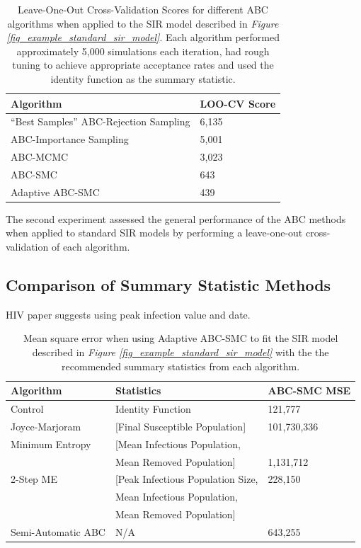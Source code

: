 \documentclass[11pt,a4paper]{article}
\theoremstyle{break}
\begin{document}
  \begin{table}[H]
    \centering
    \begin{tabular}{|l|l|}
      \hline
      \textbf{Algorithm}&\textbf{LOO-CV Score}\\\hline\hline
      ``Best Samples'' ABC-Rejection Sampling&6,135\\\hline
      ABC-Importance Sampling&5,001\\\hline
      ABC-MCMC&3,023\\\hline
      ABC-SMC&643\\\hline
      Adaptive ABC-SMC&439\\\hline
    \end{tabular}
    \caption{Leave-One-Out Cross-Validation Scores for different ABC algorithms when applied to the SIR model described in \textit{Figure \ref{fig_example_standard_sir_model}}. Each algorithm performed approximately 5,000 simulations each iteration, had rough tuning to achieve appropriate acceptance rates and used the identity function as the summary statistic.}
    \label{table_abc_methods_on_sir_model_loo_cv}
  \end{table}

  The second experiment assessed the general performance of the ABC methods when applied to standard SIR models by performing a leave-one-out cross-validation of each algorithm.

\subsection{Comparison of Summary Statistic Methods}\label{sec_comparison_of_ss_methods}

  \par HIV paper suggests using peak infection value and date.

  \begin{table}[H]
    \centering
    \begin{tabular}{|l|l|l|}
      \hline
      \textbf{Algorithm}&\textbf{Statistics}&\textbf{ABC-SMC MSE}\\
      \hline \hline
      Control&Identity Function&121,777\\\hline
      Joyce-Marjoram&[Final Susceptible Population]&101,730,336\\\hline
      Minimum Entropy&[Mean Infectious Population,&\\
      &Mean Removed Population]&1,131,712\\\hline
      2-Step ME&[Peak Infectious Population Size,&228,150\\
      &Mean Infectious Population,&\\
      &Mean Removed Population]&\\\hline
      Semi-Automatic ABC&N/A&643,255\\\hline
    \end{tabular}
    \caption{Mean square error when using Adaptive ABC-SMC to fit the SIR model described in \textit{Figure \ref{fig_example_standard_sir_model}} with the the recommended summary statistics from each algorithm.}
    \label{table_summary_selection_methods_on_sir_model}
  \end{table}
\end{document}
